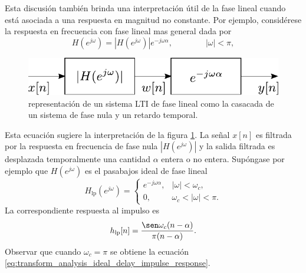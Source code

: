\documentclass[a4paper]{report}
\begin{document}
Esta discusión también brinda una interpretación útil de la fase lineal cuando está asociada a una respuesta en magnitud no constante. Por ejemplo, considérese la respuesta en frecuencia con fase lineal mas general dada por
\[
 H(e^{j\omega})=|H(e^{j\omega})|e^{-j\omega\alpha},
  \qquad\qquad 
 |\omega|<\pi,
\]
\begin{figure}[!htb]
 \begin{minipage}[c]{0.42\textwidth}
  \includegraphics[width=\textwidth]{figuras/linear_phase_lti_system_cascade.pdf}
 \end{minipage}\hfill
 \begin{minipage}[c]{0.48\textwidth}
 \caption{representación de un sistema LTI de fase lineal como la casacada de un sistema de fase nula y un retardo temporal.
 }\label{fig:linear_phase_lti_system_cascade}
 \end{minipage}
\end{figure}
Esta ecuación sugiere la interpretación de la figura \ref{fig:linear_phase_lti_system_cascade}. La señal \(x[n]\) es filtrada por la respuesta en frecuencia de fase nula \(|H(e^{j\omega})|\) y la salida filtrada es desplazada temporalmente una cantidad \(\alpha\) entera o no entera. 
Supóngase por ejemplo que \(H(e^{j\omega})\) es el pasabajos ideal de fase lineal
\begin{equation}\label{eq:transform_analysis_ideal_lowpass_frequency_response}
 H_\textrm{lp}(e^{j\omega})=
 \left\{
 \begin{array}{ll}
  e^{-j\omega\alpha}, &|\omega|<\omega_c,\\
  0,                  &\omega_c<|\omega|<\pi.
 \end{array}
 \right. 
\end{equation}
La correspondiente respuesta al impulso es
\begin{equation}\label{eq:transform_analysis_ideal_lowpass_impulse_response}
 h_\textrm{lp}[n]=\frac{\sen\omega_c(n-\alpha)}{\pi(n-\alpha)}. 
\end{equation}
Observar que cuando \(\omega_c=\pi\) se obtiene la ecuación \ref{eq:transform_analysis_ideal_delay_impulse_response}.
\end{document}
